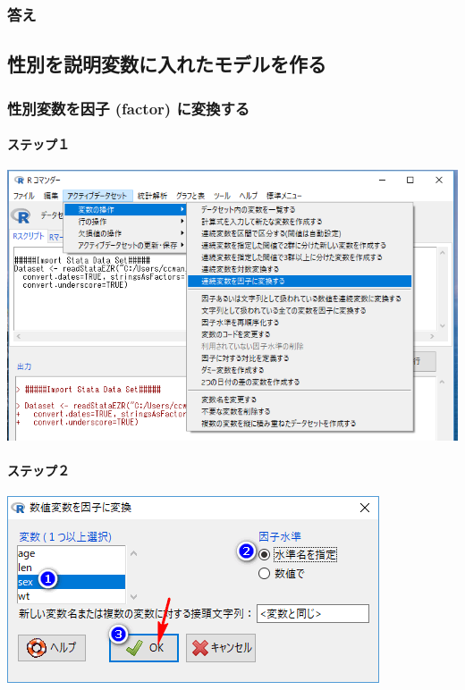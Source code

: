 \documentclass[11pt,]{problemset}
\let\oldparagraph\paragraph
\renewcommand{\paragraph}[1]{\oldparagraph{#1}\mbox{}}
\begin{document}
\subsubsection{答え}\label{-3}

\newpage

\vfill

\subsection{性別を説明変数に入れたモデルを作る}

\subsubsection{性別変数を因子 (factor) に変換する}\label{-factor-}

\paragraph{ステップ１}\label{-8}

\begin{center}\includegraphics[width=0.8\linewidth]{pic/sexfactor00} \end{center}

\paragraph{ステップ２}\label{-9}

\begin{center}\includegraphics[width=0.4\linewidth]{pic/sexfactor01} \end{center}
\end{document}

